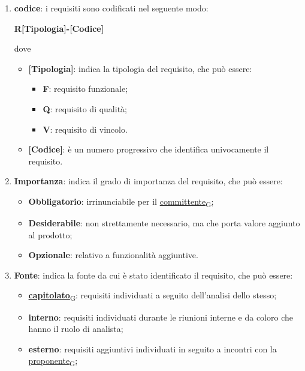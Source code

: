\begin{enumerate}
	\item \textbf{codice}: i requisiti sono codificati nel seguente modo:
	      \begin{center}
		      \textbf{R[Tipologia]-[Codice]}
	      \end{center}
	      dove
	      \begin{itemize}
		      \item \textbf{[Tipologia]}: indica la tipologia del requisito, che può essere:
		            \begin{itemize}
			            \item \textbf{F}: requisito funzionale;
			            \item \textbf{Q}: requisito di qualità;
			            \item \textbf{V}: requisito di vincolo.
		            \end{itemize}
		      \item \textbf{[Codice]}: è un numero progressivo che identifica univocamente il requisito.
	      \end{itemize}
	\item \textbf{Importanza}: indica il grado di importanza del requisito, che può essere:
	      \begin{itemize}
		      \item \textbf{Obbligatorio}: irrinunciabile per il \href{https://7last.github.io/docs/rtb/documentazione-interna/glossario\#committente}{committente\textsubscript{G}};
		      \item \textbf{Desiderabile}: non strettamente necessario, ma che porta valore aggiunto al prodotto;
		      \item \textbf{Opzionale}: relativo a funzionalità aggiuntive.
	      \end{itemize}
	\item \textbf{Fonte}: indica la fonte da cui è stato identificato il requisito, che può essere:
	      \begin{itemize}
		      \item \href{https://7last.github.io/docs/rtb/documentazione-interna/glossario\#capitolato}{\textbf{capitolato}\textsubscript{G}}: requisiti individuati a seguito dell'analisi dello stesso;
		      \item \textbf{interno}: requisiti individuati durante le riunioni interne e da coloro che hanno il ruolo di analista;
		      \item \textbf{esterno}: requisiti aggiuntivi individuati in seguito a incontri con la \href{https://7last.github.io/docs/rtb/documentazione-interna/glossario\#proponente}{proponente\textsubscript{G}};

\end{itemize}
\end{enumerate}
